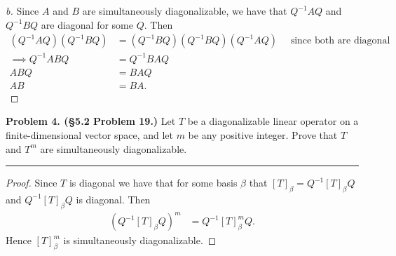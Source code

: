 \documentclass[leqno]{article}
\theoremstyle{nonumberplain}
\newtheorem{proof}{Proof}
\begin{document}
\begin{proof}[b]
Since $A$ and $B$ are simultaneously diagonalizable, we have that $Q^{-1} A Q$ and $Q^{-1} B Q$ are diagonal for some $Q$. Then
\begin{align*}
(Q^{-1}AQ)(Q^{-1}BQ)&=(Q^{-1}BQ)(Q^{-1}BQ)(Q^{-1}AQ) \textrm{~~~ since both are diagonal}\\
\implies Q^{-1}ABQ&=Q^{-1}BAQ\\
ABQ&=BAQ\\
AB&=BA.
\end{align*}
\end{proof}

\pagebreak





\noindent\textbf{Problem 4. (\S 5.2 Problem 19.)}  Let $T$ be a diagonalizable linear operator on a finite-dimensional vector space, and let $m$ be any positive integer. Prove that $T$ and $T^m$ are simultaneously diagonalizable.

\noindent\rule[0.5ex]{\linewidth}{1pt}

\begin{proof}
Since $T$ is diagonal we have that for some basis $\beta$ that $[T]_\beta=Q^{-1}[T]_\beta Q$ and $Q^{-1}[T]_\beta Q$ is diagonal. Then
\begin{align*}
(Q^{-1}[T]_\beta Q)^m &= Q^{-1} [T]_\beta^m Q.
\end{align*}
Hence $[T]_\beta^m$ is simultaneously diagonalizable.
\end{proof}


\pagebreak


\end{document}
